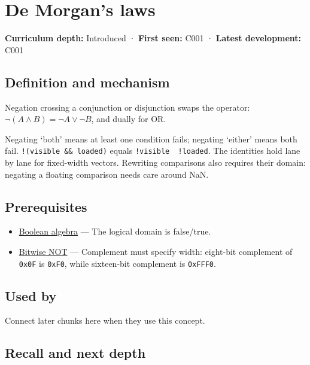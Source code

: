 \hypertarget{appendix-9079d3659da4}{}
\section{De Morgan's laws}\label{appendix-9079d3659da4-de-morgans-laws}

\textbf{Curriculum depth:} Introduced · \textbf{First seen:} C001 · \textbf{Latest development:} C001

\subsection{Definition and mechanism}\label{appendix-9079d3659da4-definition-and-mechanism}

Negation crossing a conjunction or disjunction swaps the operator: \(\neg(A\land B)=\neg A\lor\neg B\), and dually for OR.

Negating `both' means at least one condition fails; negating `either' means both fail. \texttt{!(visible\ \&\&\ loaded)} equals \texttt{!visible\ \textbar{}\textbar{}\ !loaded}. The identities hold lane by lane for fixed-width vectors. Rewriting comparisons also requires their domain: negating a floating comparison needs care around NaN.

\subsection{Prerequisites}\label{appendix-9079d3659da4-prerequisites}

\begin{itemize}
\tightlist
\item
  \hyperref[appendix-24475e1596a8]{Boolean algebra} --- The logical domain is false/true.
\item
  \hyperref[appendix-8f38927cfc54]{Bitwise NOT} --- Complement must specify width: eight-bit complement of \texttt{0x0F} is \texttt{0xF0}, while sixteen-bit complement is \texttt{0xFFF0}.
\end{itemize}

\subsection{Used by}\label{appendix-9079d3659da4-used-by}

Connect later chunks here when they use this concept.

\subsection{Recall and next depth}\label{appendix-9079d3659da4-recall-and-next-depth}

